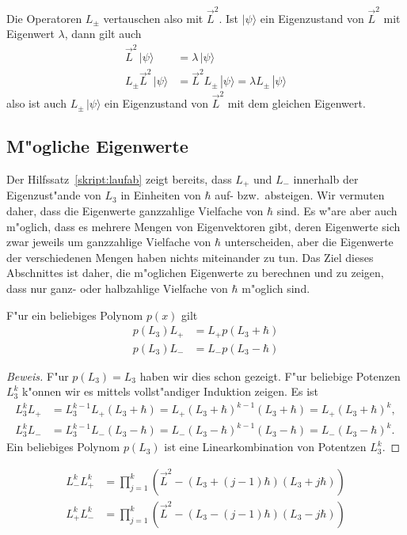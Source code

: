 Die Operatoren $L_\pm$ vertauschen also mit $\vec L^2$.
Ist $|\psi\rangle$ ein Eigenzustand von $\vec L^2$ mit Eigenwert $\lambda$,
dann gilt auch 
\begin{align*}
\vec L^2\,|\psi\rangle&=\lambda\,|\psi\rangle
\\
L_\pm\vec L^2\,|\psi\rangle&=
\vec L^2L_\pm\,|\psi\rangle=
\lambda L_\pm\,|\psi\rangle
\end{align*}
also ist  auch $L_\pm\,|\psi\rangle$ ein Eigenzustand von $\vec L^2$ mit
dem gleichen Eigenwert.

\subsection{M"ogliche Eigenwerte}
Der Hilfssatz~\ref{skript:laufab} zeigt bereits, dass $L_+$ und $L_-$
innerhalb der Eigenzust"ande von $L_3$ in Einheiten von $\hbar$
auf- bzw.~absteigen. 
Wir vermuten daher, dass die Eigenwerte ganzzahlige Vielfache von $\hbar$
sind.
Es w"are aber auch m"oglich, dass es mehrere Mengen von Eigenvektoren
gibt, deren Eigenwerte sich zwar jeweils um ganzzahlige Vielfache von $\hbar$
unterscheiden, aber die Eigenwerte der verschiedenen Mengen haben nichts
miteinander zu tun.
Das Ziel dieses Abschnittes ist daher, die m"oglichen Eigenwerte zu
berechnen und zu zeigen, dass nur ganz- oder halbzahlige Vielfache von
$\hbar$ m"oglich sind.

\begin{hilfssatz}
F"ur ein beliebiges Polynom $p(x)$ gilt
\begin{align*}
p(L_3)L_+ &= L_+ p(L_3+\hbar)\\
p(L_3)L_- &= L_- p(L_3-\hbar)
\end{align*}
\end{hilfssatz}

\begin{proof}[Beweis]
F"ur $p(L_3)=L_3$ haben wir dies schon gezeigt.
F"ur beliebige Potenzen $L_3^k$
k"onnen wir es mittels vollst"andiger Induktion zeigen.
Es ist
\begin{align*}
L_3^kL_+ &= L_3^{k-1}L_+(L_3+\hbar) = L_+(L_3+\hbar)^{k-1}(L_3+\hbar)
= L_+(L_3+\hbar)^k,
\\
L_3^kL_- &= L_3^{k-1}L_-(L_3-\hbar) = L_-(L_3-\hbar)^{k-1}(L_3-\hbar)
= L_-(L_3-\hbar)^k.
\end{align*}
Ein beliebiges Polynom $p(L_3)$ ist eine Linearkombination von Potentzen
$L_3^k$.
\end{proof}

\begin{hilfssatz}
\begin{align*}
L_-^kL_+^k
&=
\prod_{j=1}^k (\vec L^2 - (L_3+(j-1)\hbar)(L_3+j\hbar))
\\
L_+^kL_-^k
&=
\prod_{j=1}^k (\vec L^2 - (L_3-(j-1)\hbar)(L_3-j\hbar))
\end{align*}
\end{hilfssatz}

